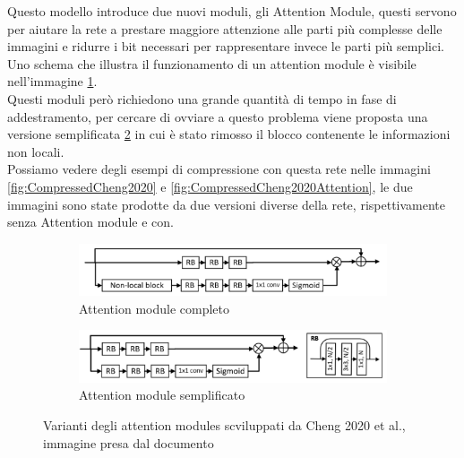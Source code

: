 Questo modello introduce due nuovi moduli, gli Attention Module, questi servono per aiutare la rete a prestare maggiore attenzione alle parti più complesse delle immagini e ridurre i bit necessari per rappresentare invece le parti più semplici. Uno schema che illustra il funzionamento di un attention module è visibile nell’immagine \ref{fig:cheng2020AttnModuleA}.\\
Questi moduli però richiedono una grande quantità di tempo in fase di addestramento, per cercare di ovviare a questo problema viene proposta una versione semplificata \ref{fig:cheng2020AttnModuleB} in cui è stato rimosso il blocco contenente le informazioni non locali.\\
Possiamo vedere degli esempi di compressione con questa rete nelle immagini \ref{fig:CompressedCheng2020} e \ref{fig:CompressedCheng2020Attention}, le due immagini sono state prodotte da due versioni diverse della rete, rispettivamente senza Attention module e con.\\
\newpage
\begin{figure}[h!]
    \centering
    \begin{subfigure}[]{0.6\textwidth}
        \includegraphics[width=\textwidth]{Immagini/Cheng2020_AttnModuleA.png}
        \caption{Attention module completo}
        \label{fig:cheng2020AttnModuleA}
    \end{subfigure}
    \vspace*{1.5cm}
    \begin{subfigure}[]{0.6\textwidth}
        \includegraphics[width=\textwidth]{Immagini/Cheng2020_AttnModuleB.png}
        \caption{Attention module semplificato}
        \label{fig:cheng2020AttnModuleB}
    \end{subfigure}
    \caption{Varianti degli attention modules scviluppati da Cheng 2020 et al., immagine presa dal documento \cite{cheng2020learned}}
    \label{fig:cheng2020AttnModule}
\end{figure}

